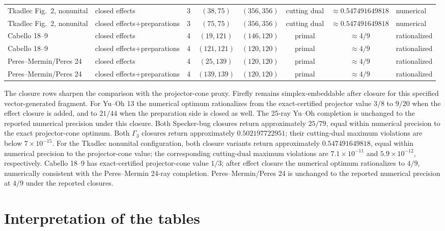 \documentclass[aps,pra,twocolumn,superscriptaddress,nofootinbib]{revtex4-2}
\begin{document}
\begin{table}[t]
{\begin{tabular}{llcccccl}
Tkadlec Fig.~2, nonunital & closed effects & 3 & $(38,75)$ & $(356,356)$ & cutting dual & $\approx0.547491649818$ & numerical\\
Tkadlec Fig.~2, nonunital & closed effects+preparations & 3 & $(75,75)$ & $(356,356)$ & cutting dual & $\approx0.547491649818$ & numerical\\
Cabello 18--9 & closed effects & 4 & $(19,121)$ & $(146,120)$ & primal & $\approx4/9$ & rationalized\\
Cabello 18--9 & closed effects+preparations & 4 & $(121,121)$ & $(120,120)$ & primal & $\approx4/9$ & rationalized\\
Peres--Mermin/Peres 24 & closed effects & 4 & $(25,139)$ & $(120,120)$ & primal & $\approx4/9$ & rationalized\\
Peres--Mermin/Peres 24 & closed effects+preparations & 4 & $(139,139)$ & $(120,120)$ & primal & $\approx4/9$ & rationalized\\
\bottomrule
\end{tabular}%
}
\end{table}

The closure rows sharpen the comparison with the projector-cone proxy.  Firefly
remains simplex-embeddable after closure for this specified vector-generated
fragment.  For Yu--Oh 13 the numerical optimum rationalizes from the
exact-certified projector value \(3/8\) to \(9/20\) when the effect closure is
added, and to \(21/44\) when the preparation side is closed as well.  The
25-ray Yu--Oh completion is unchanged to the reported numerical precision under
this closure.  Both Specker-bug closures return approximately $25/79$, equal
within numerical precision to the exact projector-cone optimum.  Both
$\Gamma_3$ closures return approximately $0.502197722951$; their cutting-dual
maximum violations are below $7\times10^{-15}$.  For the Tkadlec nonunital
configuration, both closure variants return approximately
\(0.547491649818\), equal within numerical precision to the projector-cone
value; the corresponding cutting-dual maximum violations are
\(7.1\times10^{-11}\) and \(5.9\times10^{-12}\), respectively.
Cabello 18--9 has exact-certified projector-cone value \(1/3\); after effect
closure the numerical optimum rationalizes to \(4/9\), numerically consistent with the
Peres--Mermin 24-ray completion.  Peres--Mermin/Peres 24 is unchanged to the
reported numerical precision at \(4/9\) under the reported closures.


\section{Interpretation of the tables}
\end{document}
